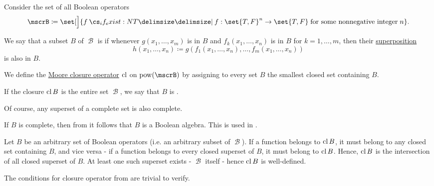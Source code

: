 \begin{definition}\label{def:boolean_closure}
  Consider the set of all Boolean operators
  \begin{equation*}
    \mscrB \coloneqq \set[\Big]{ f \given* f: \set{ T, F }^n \to \set{ T, F } \T{for some nonnegative integer} n }.
  \end{equation*}

  \begin{thmenum}
     We say that a subset \( B \) of \( \mscrB \) is  if whenever \( g(x_1, \ldots, x_m) \) is in \( B \) and \( f_k(x_1, \ldots, x_n) \) is in \( B \) for \( k = 1, \ldots, m \), then their \hyperref[rem:function_superposition]{superposition}
    \begin{equation*}
      h(x_1, \ldots, x_n) \coloneqq g(f_1(x_1, \ldots, x_n), \ldots, f_m(x_1, \ldots, x_n))
    \end{equation*}
    is also in \( B \).

     We define the \hyperref[def:moore_closure_operator]{Moore closure operator} \( \operatorname{cl} \) on \( \pow(\mscrB) \) by assigning to every set \( B \) the smallest closed set containing \( B \).

     If the closure \( \operatorname{cl}{B} \) is the entire set \( \mscrB \), we say that \( B \) is .
  \end{thmenum}
\end{definition}
\begin{comments}
  \item Of course, any superset of a complete set is also complete.
  \item If \( B \) is complete, then from  it follows that \( B \) is a Boolean algebra. This is used in .
\end{comments}
\begin{defproof}
  Let \( B \) be an arbitrary set of Boolean operators (i.e. an arbitrary subset of \( \mscrB \)). If a function belongs to \( \operatorname{cl}{B} \), it must belong to any closed set containing \( B \), and vice versa - if a function belongs to every closed superset of \( B \), it must belong to \( \operatorname{cl}{B} \). Hence, \( \operatorname{cl}{B} \) is the intersection of all closed superset of \( B \). At least one such superset exists - \( \mscrB \) itself - hence \( \operatorname{cl}{B} \) is well-defined.

  The conditions for closure operator from  are trivial to verify.
\end{defproof}

